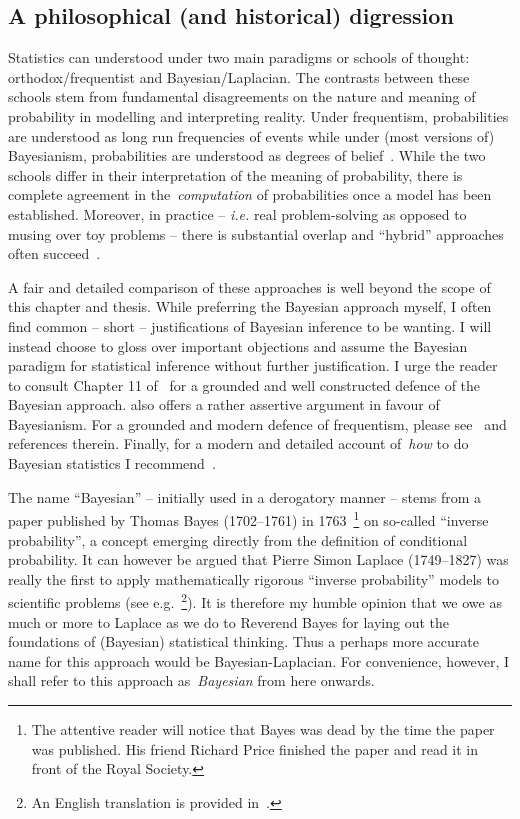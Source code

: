\subsection{A philosophical (and historical) digression}

Statistics can understood under two main paradigms or schools of thought: orthodox/frequentist and Bayesian/Laplacian.
The contrasts between these schools stem from fundamental disagreements on the nature and meaning of probability in modelling and interpreting reality.
Under frequentism, probabilities are understood as long run frequencies of events while under (most versions of) Bayesianism, probabilities are understood as degrees of belief~\citep{Lindley2000}.
While the two schools differ in their interpretation of the meaning of probability, there is complete agreement in the~\textit{computation} of probabilities once a model has been established.
Moreover, in practice -- \textit{i.e.} real problem-solving as opposed to musing over toy problems -- there is substantial overlap and ``hybrid'' approaches often succeed~\citep{Kass2011}.

A fair and detailed comparison of these approaches is well beyond the scope of this chapter and thesis.
While preferring the Bayesian approach myself, I often find common -- short --  justifications of Bayesian inference to be wanting.
I will instead choose to gloss over important objections and assume the Bayesian paradigm for statistical inference without further justification.
I urge the reader to consult Chapter 11 of~\cite{Robert2007} for a grounded and well constructed defence of the Bayesian approach.
\cite{Jaynes2003} also offers a rather assertive argument in favour of Bayesianism.
For a grounded and modern defence of frequentism, please see~\cite{Mayo2011} and references therein.
Finally, for a modern and detailed account of~\textit{how} to do Bayesian statistics I recommend~\cite{Gelman2014b}.

The name ``Bayesian'' -- initially used in a derogatory manner -- stems from a paper published by Thomas Bayes (1702--1761) in 1763~\citep{Bayes1763}\footnote{The attentive reader will notice that Bayes was dead by the time the paper was published. His friend Richard Price finished the paper and read it in front of the Royal Society.} on so-called ``inverse probability'', a concept emerging directly from the definition of conditional probability.
It can however be argued that Pierre Simon Laplace (1749--1827) was really the first to apply mathematically rigorous ``inverse probability'' models to scientific problems (see e.g.~\cite{Laplace1774}\footnote{An English translation is provided in~\cite{Stigler1986}.}).
It is therefore my humble opinion that we owe as much or more to Laplace as we do to Reverend Bayes for laying out the foundations of (Bayesian) statistical thinking.
Thus a perhaps more accurate name for this approach would be Bayesian-Laplacian.
For convenience, however, I shall refer to this approach as~\textit{Bayesian} from here onwards.
 
